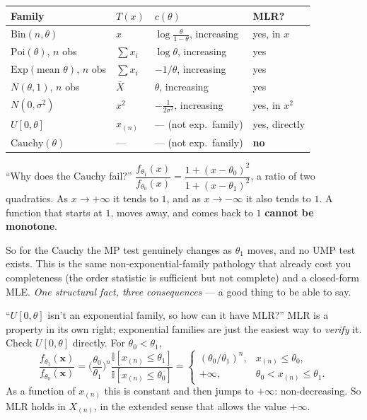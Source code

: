 \documentclass[11pt]{article}
\newcommand{\Xbar}{\overline{X}}
\newcommand{\I}{\mathbb{I}}
\begin{document}
\begin{center}
\renewcommand{\arraystretch}{1.35}
\begin{tabular}{@{}llll@{}}
\toprule
Family & $T(x)$ & $c(\theta)$ & MLR? \\
\midrule
$\mathrm{Bin}(n,\theta)$ & $x$ & $\log\frac{\theta}{1-\theta}$, increasing & yes, in $x$ \\
$\mathrm{Poi}(\theta)$, $n$ obs & $\sum x_i$ & $\log\theta$, increasing & yes \\
$\mathrm{Exp}(\text{mean }\theta)$, $n$ obs & $\sum x_i$ & $-1/\theta$, increasing & yes \\
$N(\theta,1)$, $n$ obs & $\Xbar$ & $\theta$, increasing & yes \\
$N(0,\sigma^2)$ & $x^2$ & $-\frac{1}{2\sigma^2}$, increasing & yes, in $x^2$ \\
$U[0,\theta]$ & $x_{(n)}$ & --- (not exp.\ family) & yes, directly \\
$\mathrm{Cauchy}(\theta)$ & --- & --- (not exp.\ family) & \textbf{no} \\
\bottomrule
\end{tabular}
\end{center}

\begin{confusion}{``Why does the Cauchy fail?''}
$\dfrac{f_{\theta_1}(x)}{f_{\theta_0}(x)}=\dfrac{1+(x-\theta_0)^2}{1+(x-\theta_1)^2}$, a ratio
of two quadratics. As $x\to+\infty$ it tends to $1$, and as $x\to-\infty$ it also tends to $1$.
A function that starts at $1$, moves away, and comes back to $1$ \textbf{cannot be monotone}.

So for the Cauchy the MP test genuinely changes as $\theta_1$ moves, and no UMP test exists.
This is the same non-exponential-family pathology that already cost you completeness (the order
statistic is sufficient but not complete) and a closed-form MLE. \emph{One structural fact,
three consequences} --- a good thing to be able to say.
\end{confusion}

\begin{confusion}{``$U[0,\theta]$ isn't an exponential family, so how can it have MLR?''}
MLR is a property in its own right; exponential families are just the easiest way to
\emph{verify} it. Check $U[0,\theta]$ directly. For $\theta_0<\theta_1$,
\[
\frac{f_{\theta_1}(\mathbf x)}{f_{\theta_0}(\mathbf x)}
=\Big(\frac{\theta_0}{\theta_1}\Big)^{n}\frac{\I[x_{(n)}\le\theta_1]}{\I[x_{(n)}\le\theta_0]}
=\begin{cases}
(\theta_0/\theta_1)^n, & x_{(n)}\le\theta_0,\\
+\infty, & \theta_0<x_{(n)}\le\theta_1 .
\end{cases}
\]
As a function of $x_{(n)}$ this is constant and then jumps to $+\infty$: non-decreasing.
So MLR holds in $X_{(n)}$, in the extended sense that allows the value $+\infty$.
\end{confusion}
\end{document}
